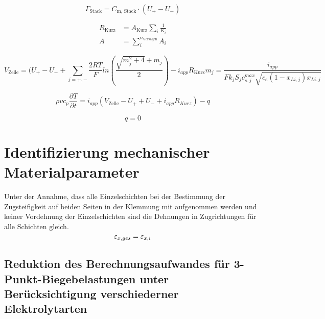 \begin{equation}
    \Gamma_{\text{Stack}} = C_{\text{m, Stack}} \cdot \left(U_{+} - U_{-}\right)
\end{equation}

\begin{align}
    R_{\text{Kurz}} &= A_{\text{Kurz}} \sum_{i} \frac{1}{K_i}\\
    A &= \sum_{i}^{n_{\text{Versagen}}} A_{i}
\end{align}

\begin{equation}
    V_{\text{Zelle}} = (U_{+} - U_{-} + \sum_{j=+,-} \frac{2 RT}{F} ln\left(\frac{\sqrt{m_j^2 +4} + m_j}{2}\right) - i_{app} R_{\text{Kurz}}
    m_j = \frac{i_{app}}{F k_j S_j c_{s,j}^{max} \sqrt{c_e (1-x_{Li,j}) x_{Li,j}}} 
\end{equation}

\begin{equation}
    \rho v c_p \frac{\partial T}{\partial t} = i_{app}\left(V_{\text{Zelle}} - U_{+} + U_{-} + i_{app} R_{Kurz} \right) -q
\end{equation}

\begin{equation}
    q = 0
\end{equation}

\section{\label{sec:improve_mech}Identifizierung mechanischer Materialparameter}
Unter der Annahme, dass alle Einzelschichten bei der Bestimmung der Zugsteifigkeit auf beiden Seiten in der Klemmung mit aufgenommen werden und keiner Vordehnung der Einzelschichten sind die Dehnungen in Zugrichtungen für alle Schichten gleich.
\begin{equation}
    \varepsilon_{x,ges} = \varepsilon_{x,i}\\
\end{equation}



\subsection*{Reduktion des Berechnungsaufwandes für 3-Punkt-Biegebelastungen unter Berücksichtigung verschiederner Elektrolytarten}

